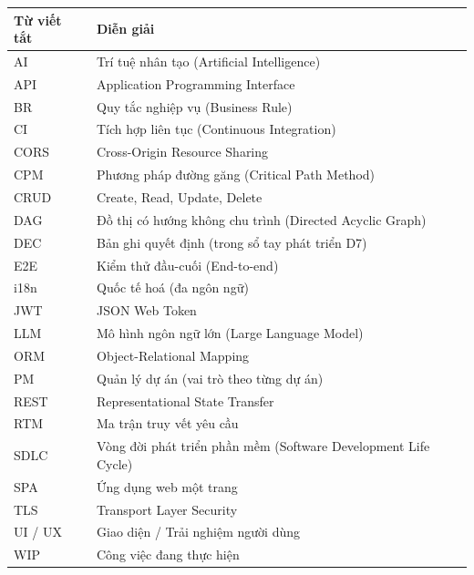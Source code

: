 \documentclass[../main.tex]{subfiles}
\begin{document}
\begin{table}[H]
\centering
\renewcommand{\arraystretch}{1.3}
\begin{tabular}{|p{3.5cm}|p{10cm}|}
\hline
\textbf{Từ viết tắt} & \textbf{Diễn giải} \\
\hline
AI & Trí tuệ nhân tạo (Artificial Intelligence) \\ \hline
API & Application Programming Interface \\ \hline
BR & Quy tắc nghiệp vụ (Business Rule) \\ \hline
CI & Tích hợp liên tục (Continuous Integration) \\ \hline
CORS & Cross-Origin Resource Sharing \\ \hline
CPM & Phương pháp đường găng (Critical Path Method) \\ \hline
CRUD & Create, Read, Update, Delete \\ \hline
DAG & Đồ thị có hướng không chu trình (Directed Acyclic Graph) \\ \hline
DEC & Bản ghi quyết định (trong sổ tay phát triển D7) \\ \hline
E2E & Kiểm thử đầu-cuối (End-to-end) \\ \hline
i18n & Quốc tế hoá (đa ngôn ngữ) \\ \hline
JWT & JSON Web Token \\ \hline
LLM & Mô hình ngôn ngữ lớn (Large Language Model) \\ \hline
ORM & Object-Relational Mapping \\ \hline
PM & Quản lý dự án (vai trò theo từng dự án) \\ \hline
REST & Representational State Transfer \\ \hline
RTM & Ma trận truy vết yêu cầu \\ \hline
SDLC & Vòng đời phát triển phần mềm (Software Development Life Cycle) \\ \hline
SPA & Ứng dụng web một trang \\ \hline
TLS & Transport Layer Security \\ \hline
UI / UX & Giao diện / Trải nghiệm người dùng \\ \hline
WIP & Công việc đang thực hiện \\ \hline
\end{tabular}
\end{table}
\end{document}

